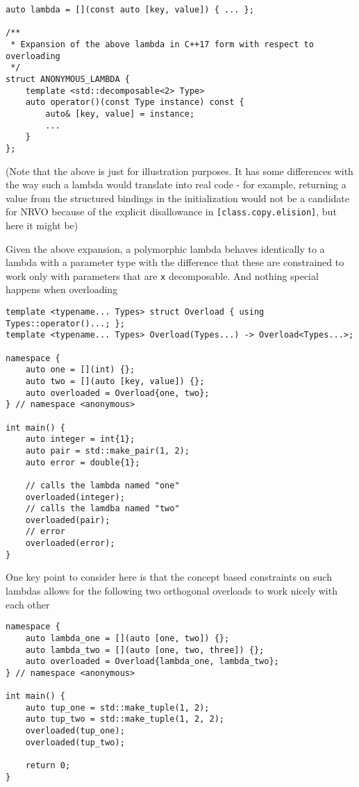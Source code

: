 \documentclass{article}
\begin{document}
\begin{lstlisting}
auto lambda = [](const auto [key, value]) { ... };

/**
 * Expansion of the above lambda in C++17 form with respect to overloading
 */
struct ANONYMOUS_LAMBDA {
    template <std::decomposable<2> Type>
    auto operator()(const Type instance) const {
        auto& [key, value] = instance;
        ...
    }
};
\end{lstlisting}

(Note that the above is just for illustration purposes.  It has some
differences with the way such a lambda would translate into real code - for
example, returning a value from the structured bindings in the initialization
would not be a candidate for NRVO because of the explicit disallowance in
\texttt{[class.copy.elision]}, but here it might be)

Given the above expansion, a polymorphic lambda behaves identically to a
lambda with a  parameter type with the difference that these are
constrained to work only with parameters that are \texttt{x} decomposable.
And nothing special happens when overloading

\begin{lstlisting}
template <typename... Types> struct Overload { using Types::operator()...; };
template <typename... Types> Overload(Types...) -> Overload<Types...>;

namespace {
    auto one = [](int) {};
    auto two = [](auto [key, value]) {};
    auto overloaded = Overload{one, two};
} // namespace <anonymous>

int main() {
    auto integer = int{1};
    auto pair = std::make_pair(1, 2);
    auto error = double{1};

    // calls the lambda named "one"
    overloaded(integer);
    // calls the lamdba named "two"
    overloaded(pair);
    // error
    overloaded(error);
}
\end{lstlisting}

One key point to consider here is that the concept based constraints on such
lambdas allows for the following two orthogonal overloads to work nicely with
each other

\begin{lstlisting}
namespace {
    auto lambda_one = [](auto [one, two]) {};
    auto lambda_two = [](auto [one, two, three]) {};
    auto overloaded = Overload{lambda_one, lambda_two};
} // namespace <anonymous>

int main() {
    auto tup_one = std::make_tuple(1, 2);
    auto tup_two = std::make_tuple(1, 2, 2);
    overloaded(tup_one);
    overloaded(tup_two);

    return 0;
}
\end{lstlisting}
\end{document}
